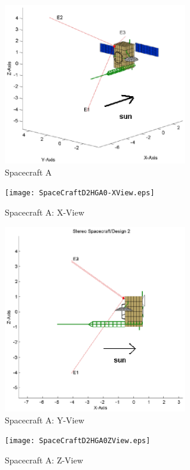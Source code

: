\documentclass[a4paper,10pt]{thesis}
\begin{document}
\begin{figure}
  \begin{center}
\includegraphics[width=8cm]{SpaceCraftD2HGA0Oblique.eps}\\
  \caption{Spacecraft A}\label{fig_D2_A_Oblique}
  \texttt{[image: SpaceCraftD2HGA0-XView.eps]}\\
  \caption{Spacecraft A: X-View}\label{fig_D2_A_X_View}\end{center}
\end{figure}

\begin{figure}
  \begin{center}
\includegraphics[width=8cm]{SpaceCraftD2HGA0-YView.eps}\\
  \caption{Spacecraft A: Y-View}\label{fig_D2_A_Y_View}
  \texttt{[image: SpaceCraftD2HGA0ZView.eps]}\\
  \caption{Spacecraft A: Z-View}\label{fig_D2_A_Z_View}\end{center}
\end{figure}
\end{document}
